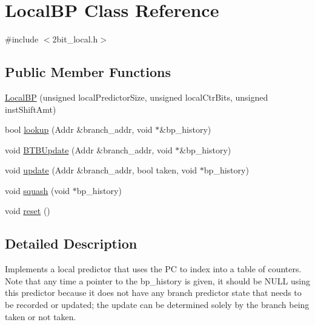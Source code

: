 \hypertarget{classLocalBP}{
\section{LocalBP Class Reference}
\label{classLocalBP}
}


{\ttfamily \#include $<$2bit\_\-local.h$>$}

\subsection*{Public Member Functions}
\begin{DoxyCompactItemize}
\item 
\hyperlink{classLocalBP_a4912c10c3c6e1ca0da87938af3f1c222}{LocalBP} (unsigned localPredictorSize, unsigned localCtrBits, unsigned instShiftAmt)
\item 
bool \hyperlink{classLocalBP_ab884d4daf328f3284fe92c0ef3f5a37b}{lookup} (Addr \&branch\_\-addr, void $\ast$\&bp\_\-history)
\item 
void \hyperlink{classLocalBP_a6efe84f10a9141f20a9abeeaa1a76de1}{BTBUpdate} (Addr \&branch\_\-addr, void $\ast$\&bp\_\-history)
\item 
void \hyperlink{classLocalBP_a4d29b367b9ab3f0ab7250d1cce4b032b}{update} (Addr \&branch\_\-addr, bool taken, void $\ast$bp\_\-history)
\item 
void \hyperlink{classLocalBP_a19ff947a742878b0a27e23b72b867ff7}{squash} (void $\ast$bp\_\-history)
\item 
void \hyperlink{classLocalBP_ad2dea54aac38758317ca727d34cf98e2}{reset} ()
\end{DoxyCompactItemize}


\subsection{Detailed Description}
Implements a local predictor that uses the PC to index into a table of counters. Note that any time a pointer to the bp\_\-history is given, it should be NULL using this predictor because it does not have any branch predictor state that needs to be recorded or updated; the update can be determined solely by the branch being taken or not taken. 


